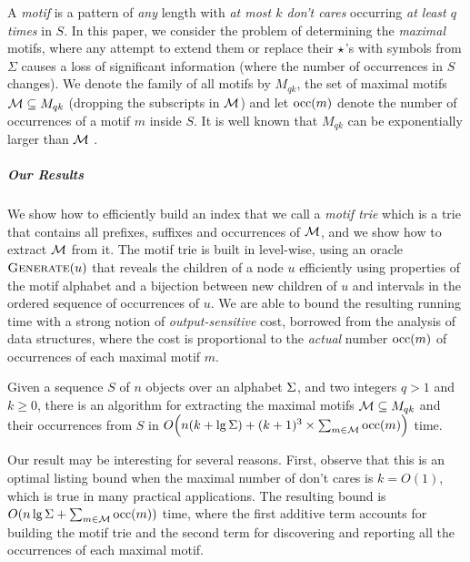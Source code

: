 A \emph{motif} is a pattern of \emph{any} length with \emph{at most   $k$ don't cares} occurring \emph{at least $q$ times} in $S$. In this paper, we consider the problem of determining the \emph{maximal} motifs, where any attempt to extend them or replace their $\star$'s with symbols from $\Sigma$ causes a loss of significant information (where the number of occurrences in $S$ changes).  We denote the family of all motifs by $M_{qk}$, the set of maximal motifs $\mathcal{M} \subseteq M_{qk}$ (dropping the subscripts in $\mathcal{M}$) and let $\operatorname{occ}(m)$ denote the number of occurrences of a motif $m$ inside $S$. It is well known that $M_{qk}$ can be exponentially larger than $\mathcal{M}$ \cite{Parida00}.

\subparagraph{Our Results}
We show how to efficiently build an index that we call a \emph{motif trie} which is a trie that contains all prefixes, suffixes and occurrences of $\mathcal{M}$, and we show how to extract $\mathcal{M}$ from it. The motif trie is built in level-wise, using an oracle $\operatorname{\textsc{Generate}}(u)$ that reveals the children of a node $u$ efficiently using properties of the motif alphabet and a bijection between new children of $u$ and intervals in the ordered sequence of occurrences of $u$. We are able to bound the resulting running time with a strong notion of \emph{output-sensitive} cost, borrowed from the analysis of data structures, where the cost is proportional to the \emph{actual} number $\operatorname{occ}(m)$ of occurrences of each maximal motif $m$.

\begin{theorem}\label{the:main}
    Given a sequence $S$ of $n$ objects over an alphabet $\Sigma$, and two integers $q > 1$ and $k \geq 0$, there is an algorithm for extracting the maximal motifs $\mathcal{M} \subseteq M_{qk}$ and their occurrences from $S$ in 
$
O \Bigl( n (k + \lg \Sigma) + (k+1)^3 \times  \sum_{m \in \mathcal{M}} \operatorname{occ}(m) \Bigr)
$
time.
\end{theorem}

Our result may be interesting for several reasons.
%
First, observe that this is an optimal listing bound when the maximal number of don't cares is $k=O(1)$, which is true in many practical applications. The resulting bound is $O(n \lg \Sigma + \sum_{m \in \mathcal{M}} \operatorname{occ}(m))$ time, where the first additive term accounts for building the motif trie and the second term for discovering and reporting all the occurrences of each maximal motif. 

